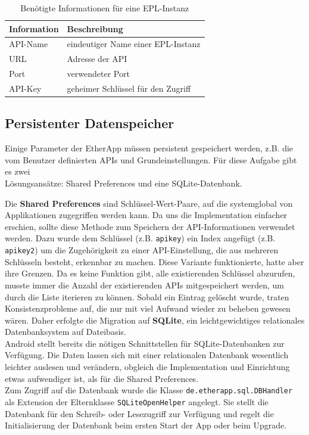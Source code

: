 \begin{table}[h!]
    \begin{center}
      \footnotesize
      \begin{tabular}{|l|l|}
          \hline \textbf{Information} & \textbf{Beschreibung}\\
          \hline
          \hline API-Name & eindeutiger Name einer EPL-Instanz\\
          \hline URL & Adresse der API\\
          \hline Port & verwendeter Port\\
          \hline API-Key & geheimer Schlüssel für den Zugriff\\
          \hline
      \end{tabular}
    \caption{Benötigte Informationen für eine EPL-Instanz}
    \label{tbl:EPLi}
    \end{center}
\end{table}

\subsection{Persistenter Datenspeicher}
Einige Parameter der EtherApp müssen persistent gespeichert werden, z.B. die vom Benutzer definierten APIs und Grundeinstellungen.
Für diese Aufgabe gibt es zwei\\
Lösungsansätze: Shared Preferences und eine SQLite-Datenbank.

Die \textbf{Shared Preferences} sind Schlüssel-Wert-Paare, auf die systemglobal von Applikationen zugegriffen werden kann.
Da uns die Implementation einfacher erschien, sollte diese Methode zum Speichern der API-Informationen verwendet werden.
Dazu wurde dem Schlüssel (z.B. \texttt{apikey}) ein Index angefügt (z.B. \texttt{apikey2}) um die Zugehörigkeit zu einer API-Einstellung, die aus mehreren Schlüsseln besteht, erkennbar zu machen.
Diese Variante funktionierte, hatte aber ihre Grenzen.
Da es keine Funktion gibt, alle existierenden Schlüssel abzurufen, musste immer die Anzahl der existierenden APIs mitgespeichert werden, um durch die Liste iterieren zu können.
Sobald ein Eintrag gelöscht wurde, traten Konsistenzprobleme auf, die nur mit viel Aufwand wieder zu beheben gewesen wären.
Daher erfolgte die Migration auf \textbf{SQLite}, ein leichtgewichtiges relationales Datenbanksystem auf Dateibasis.\\
Android stellt bereits die nötigen Schnittstellen für SQLite-Datenbanken zur Verfügung.
Die Daten lassen sich mit einer relationalen Datenbank wesentlich leichter auslesen und verändern, obgleich die Implementation und Einrichtung etwas aufwendiger ist, als für die Shared Preferences.\\
Zum Zugriff auf die Datenbank wurde die Klasse \texttt{de.etherapp.sql.DBHandler} als Extension der Elternklasse \texttt{SQLiteOpenHelper} angelegt.
Sie stellt die Datenbank für den Schreib- oder Lesezugriff zur Verfügung und regelt die Initialisierung der Datenbank beim ersten Start der App oder beim Upgrade.

